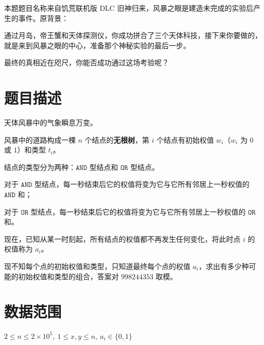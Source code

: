 \documentclass[a4paper,10pt]{article}
\begin{document}
本题题目名称来自饥荒联机版 DLC 旧神归来，风暴之眼是建造未完成的实验后产生的事件。原背景：

通过月岛，帝王蟹和天体探测仪，你成功拼合了三个天体科技，接下来你要做的，就是来到风暴之眼的中心，准备那个神秘实验的最后一步。

最终的真相近在咫尺，你能否成功通过这场考验呢？

\section*{题目描述}

天体风暴中的气象瞬息万变。

风暴中的道路构成一棵 $n$ 个结点的\textbf{无根树}，第 $i$ 个结点有初始权值 $w_i$（$w_i$ 为 $0$ 或 $1$）和类型 $t_i$。

结点的类型分为两种：$\texttt{AND}$ 型结点和 $\texttt{OR}$ 型结点。

对于 $\texttt{AND}$ 型结点，每一秒结束后它的权值将变为它与它所有邻居上一秒权值的 $\texttt{AND}$ 和；

对于 $\texttt{OR}$ 型结点，每一秒结束后它的权值将变为它与它所有邻居上一秒权值的 $\texttt{OR}$ 和。

现在，已知从某一时刻起，所有结点的权值都不再发生任何变化，将此时点 $i$ 的权值称为 $a_i$。

现不知每个点的初始权值和类型，只知道最终每个点的权值 $a_i$，求出有多少种可能的初始权值和类型的组合，答案对 $998244353$ 取模。

\section*{数据范围}

$2\leq n\leq 2\times 10^5,\ 1\leq x,y\leq n,\ a_i\in \{0,1\}$

\newpage
\end{document}
